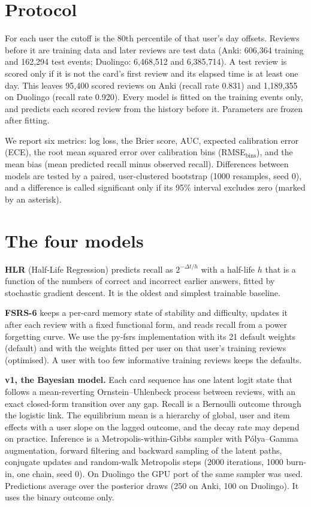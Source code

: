 \documentclass[11pt,a4paper]{article}
\begin{document}
\section{Protocol}
For each user the cutoff is the 80th percentile of that user's day offsets. Reviews before it are training data and later reviews are test data
(Anki: 606,364 training and 162,294 test events; Duolingo: 6,468,512 and 6,385,714). A test review is scored only if it is not the card's first review and its elapsed time is at
least one day. This leaves 95,400 scored reviews on Anki (recall rate 0.831) and 1,189,355 on Duolingo (recall rate 0.920). Every model is fitted on the training events only,
and predicts each scored review from the history before it. Parameters are frozen after fitting.

We report six metrics: log loss, the Brier score, AUC, expected calibration error (ECE), the root mean squared error over calibration bins (RMSE$_{\mathrm{bins}}$), and the mean bias
(mean predicted recall minus observed recall). Differences between models are tested by a paired, user-clustered bootstrap (1000 resamples, seed 0), and a difference is called
significant only if its 95\% interval excludes zero (marked by an asterisk).

\section{The four models}
\textbf{HLR} (Half-Life Regression) predicts recall as $2^{-\Delta t/h}$ with a half-life $h$ that is a function of the numbers of correct and incorrect earlier answers, fitted by
stochastic gradient descent. It is the oldest and simplest trainable baseline.

\textbf{FSRS-6} keeps a per-card memory state of stability and difficulty, updates it after each review with a fixed functional form, and reads recall from a power forgetting curve. We use the
py-fsrs implementation with its 21 default weights (default) and with the weights fitted per user on that user's training reviews (optimised). A user with too few informative training reviews
keeps the defaults.

\textbf{v1, the Bayesian model.} Each card sequence has one latent logit state that follows a mean-reverting Ornstein--Uhlenbeck process between reviews, with an exact closed-form transition over any
gap. Recall is a Bernoulli outcome through the logistic link. The equilibrium mean is a hierarchy of global, user and item effects with a user slope on the lagged outcome, and the decay rate may depend on
practice. Inference is a Metropolis-within-Gibbs sampler with P\'olya--Gamma augmentation, forward filtering and backward sampling of the latent paths, conjugate updates and random-walk Metropolis steps (2000
iterations, 1000 burn-in, one chain, seed 0). On Duolingo the GPU port of the same sampler was used. Predictions average over the posterior draws (250 on Anki, 100 on Duolingo). It uses the binary outcome only.
\end{document}
